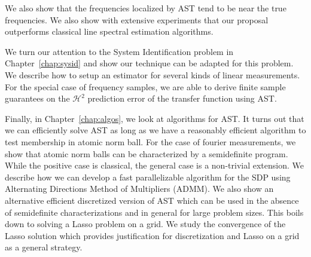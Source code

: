 We also show that the frequencies localized by AST tend to be near the true
frequencies. We also show with extensive experiments that our proposal
outperforms classical line spectral estimation algorithms.

We turn our attention to the System Identification problem in
Chapter~\ref{chap:sysid} and show our technique can be adapted for this problem.
We describe how to setup an estimator for several kinds of linear measurements.
For the special case of frequency samples, we are able to derive finite sample
guarantees on the $\mathcal{H}^2$ prediction error of the transfer function
using AST.

Finally, in Chapter~\ref{chap:algos}, we look at algorithms for AST. It turns
out that we can efficiently solve AST as long as we have a reasonably efficient
algorithm to test membership in atomic norm ball. For the case of fourier
measurements, we show that atomic norm balls can be characterized by a
semidefinite program. While the positive case is classical, the general case is
a non-trivial extension. We describe how we can develop a fast parallelizable
algorithm for the SDP using Alternating Directions Method of Multipliers (ADMM).
We also show an alternative efficient discretized version of AST which can be
used in the absence of semidefinite characterizations and in general for large
problem sizes. This boils down to solving a Lasso problem on a grid. We study
the convergence of the Lasso solution which provides justification for discretization and Lasso on a grid as a general strategy.

